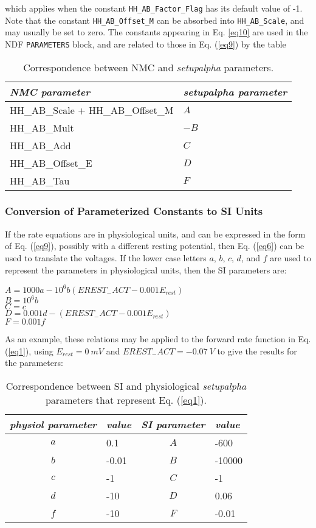 \documentclass[12pt]{article}
\begin{document}
which applies when the constant {\tt HH\_AB\_Factor\_Flag} has its default
value of -1.  Note that the constant {\tt HH\_AB\_Offset\_M} can be
absorbed into {\tt HH\_AB\_Scale}, and may usually be set to zero.
The constants appearing in Eq. \ref{eq10} are used in the
NDF {\tt PARAMETERS} block, and are related to those in Eq. (\ref{eq9})
by the table

\begin{table}[thb]
\label{tab3}
\centering
\begin{tabular}{ll} \hline
{\em NMC parameter}	 & {\em setupalpha parameter} \\
\hline
 HH\_AB\_Scale + HH\_AB\_Offset\_M & $A$ \\
 HH\_AB\_Mult & $-B$ \\
 HH\_AB\_Add   & $C$ \\
 HH\_AB\_Offset\_E & $D$ \\
 HH\_AB\_Tau & $F$ \\
\hline
\end{tabular}
\caption{Correspondence between NMC and {\em setupalpha} parameters.}
\end{table}

\subsubsection{Conversion of Parameterized Constants to SI Units}
\label{sec4-1}

If the rate equations are in physiological units, and can be expressed
in the form of Eq. (\ref{eq9}), possibly with a different resting potential,
then Eq. (\ref{eq6}) can be used to translate the voltages.  If the lower case
letters $a$, $b$, $c$, $d$, and $f$ are used to represent the parameters
in physiological units, then the SI parameters are:

$A = 1000 a - 10^6 b (EREST_{-}ACT - 0.001 E_{rest})$ \\
$B = 10^6 b$ \\
$C = c$ \\
$D = 0.001 d - (EREST_{-}ACT - 0.001 E_{rest})$ \\
$F = 0.001 f$

As an example, these relations may be applied to the forward rate function
in Eq. (\ref{eq1}), using $E_{rest} = 0 ~mV$ and $EREST_{-}ACT = -0.07 ~V$
to give the results for the parameters:

\begin{table}[thb]
\label{tab4}
\centering
\begin{tabular}{clcl} \hline
{\em physiol parameter } & {\em value}  & {\em SI parameter} & {\em value} \\
\hline

$a$  & 0.1 & $A$ & -600 \\
$b$  & -0.01 & $B$ & -10000 \\
$c$  & -1 & $C$ & -1 \\
$d$  & -10 & $D$ & 0.06 \\
$f$  & -10 & $F$ & -0.01 \\
\hline
\end{tabular}
\caption{Correspondence between SI and physiological {\em setupalpha}
parameters that represent Eq. (\ref{eq1}).}
\end{table}
\end{document}
